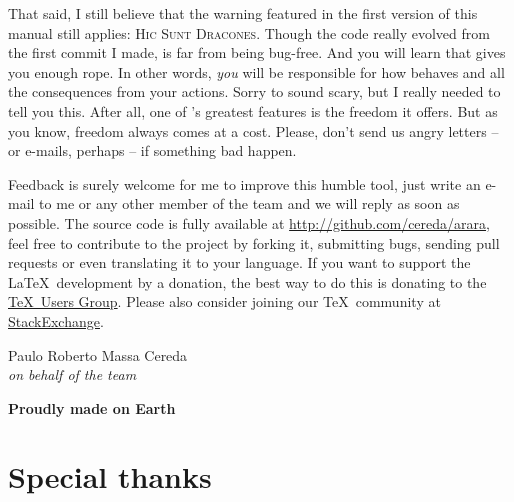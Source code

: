 \documentclass[a4paper,twoside,12pt]{memoir}
\begin{document}
That said, I still believe that the warning featured in the first version of this manual still applies:
\textsc{Hic Sunt Dracones}. Though the code really evolved from the first commit I made, \arara is far from
being bug-free. And you will learn that \arara gives you enough rope. In other words, \emph{you} will be
responsible for how \arara behaves and all the consequences from your actions. Sorry to sound scary, but I
really needed to tell you this. After all, one of \arara's greatest features is the freedom it offers. But as you
know, freedom always comes at a cost. Please, don't send us angry letters -- or e-mails, perhaps -- if
something bad happen.

Feedback is surely welcome for me to improve this humble tool, just write an e-mail to me or any other
member of the team and we will reply as soon as possible. The source code is fully available at
\url{http://github.com/cereda/arara}, feel free to contribute to the project by forking it, submitting bugs,
sending pull requests or even translating it to your language. If you want to support the \LaTeX\ development
by a donation, the best way to do this is donating to the \href{http://www.tug.org/}{\TeX\ Users Group}.
Please also  consider joining our \TeX\ community at \href{http://tex.stackexchange.com}{StackExchange}.

\vspace{2em}

\begin{flushright}
Paulo Roberto Massa Cereda\\
\emph{on behalf of the \arara team}
\end{flushright}

\vfill

\begin{center}
\scalebox{0.55}{\araralogo}

\vspace{0.3em}

{\color{araracolor}\bfseries\large Proudly made on Earth}
\end{center}

\cleardoublepage

\section*{Special thanks}
\end{document}
